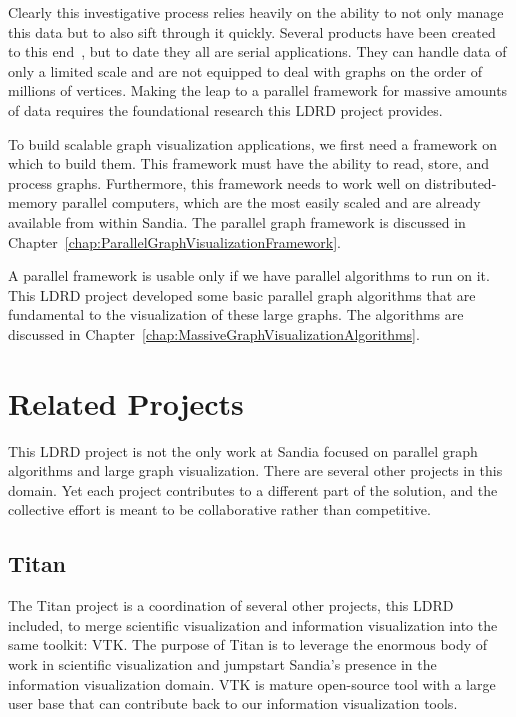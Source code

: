 \documentclass[pdf,12pt,report,strict]{SANDreport}
\newcommand*{\lcite}[1]{~\cite{#1}}
\newcommand{\titan}{Titan\index{Titan}\xspace}
\begin{document}
Clearly this investigative process relies heavily on the ability to not
only manage this data but to also sift through it quickly.  Several
products have been created to this end\lcite{Hetzler98,Thomas99,Boyack01},
but to date they all are serial applications.  They can handle data of only
a limited scale and are not equipped to deal with graphs on the order of
millions of vertices.  Making the leap to a parallel framework for massive
amounts of data requires the foundational research this LDRD project
provides.

To build scalable graph visualization applications, we first need a
framework on which to build them.  This framework must have the ability to
read, store, and process graphs.  Furthermore, this framework needs to work
well on distributed-memory parallel computers, which are the most easily
scaled and  are already available from within Sandia.  The parallel graph
framework is discussed in
Chapter~\ref{chap:ParallelGraphVisualizationFramework}.

A parallel framework is usable only if we have parallel algorithms to run
on it.  This LDRD project developed some basic parallel graph algorithms
that are fundamental to the visualization of these large graphs.  The
algorithms are discussed in
Chapter~\ref{chap:MassiveGraphVisualizationAlgorithms}.

\section{Related Projects}
\label{sec:RelatedProjects}

This LDRD project is not the only work at Sandia focused on parallel graph
algorithms and large graph visualization.  There are several other projects
in this domain.  Yet each project contributes to a different part of the
solution, and the collective effort is meant to be collaborative rather
than competitive.

\subsection{\titan}
\label{sec:RelatedProjects:Titan}


The \titan project is a coordination of several other projects, this LDRD
included, to merge scientific visualization
and information visualization into the
same toolkit: VTK.  The purpose of \titan is to leverage the
enormous body of work in scientific visualization and jumpstart Sandia's
presence in the information visualization domain.  VTK is mature
open-source tool with a large user base that can contribute back to our
information visualization tools.
\end{document}
